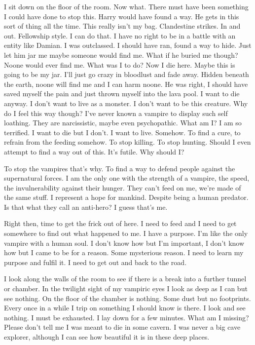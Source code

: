 I sit down on the floor of the room. Now what. There must have been something I could have done to stop this. Harry would have found a way. He gets in this sort of thing all the time. This really isn't my bag. Clandestine strikes. In and out. Fellowship style. I can do that. I have no right to be in a battle with an entity like Damian. I was outclassed. I should have ran, found a way to hide. Just let him jar me maybe someone would find me. What if he buried me though? Noone would ever find me. What was I to do? Now I die here. Maybe this is going to be my jar. I'll just go crazy in bloodlust and fade away. Hidden beneath the earth, noone will find me and I can harm noone. He was right, I should have saved myself the pain and just thrown myself into the lava pool. I want to die anyway. I don't want to live as a monster. I don't want to be this creature. Why do I feel this way though? I've never known a vampire to display such self loathing. They are narcissistic, maybe even psychopathic. What am I? I am so terrified. I want to die but I don't. I want to live. Somehow. To find a cure, to refrain from the feeding somehow. To stop killing. To stop hunting. Should I even attempt to find a way out of this. It's futile. Why should I?

To stop the vampires that's why. To find a way to defend people against the supernatural forces. I am the only one with the strength of a vampire, the speed, the invulnerability against their hunger. They can't feed on me, we're made of the same stuff. I represent a hope for mankind. Despite being a human predator. Is that what they call an anti-hero? I guess that's me.

Right then, time to get the frick out of here. I need to feed and I need to get somewhere to find out what happened to me. I have a purpose. I'm like the only vampire with a human soul. I don't know how but I'm important, I don't know how but I came to be for a reason. Some mysterious reason. I need to learn my purpose and fulfil it. I need to get out and back to the road.

I look along the walls of the room to see if there is a break into a further tunnel or chamber. In the twilight sight of my vampiric eyes I look as deep as I can but see nothing. On the floor of the chamber is nothing. Some dust but no footprints. Every once in a while I trip on something I should know is there. I look and see nothing. I must be exhausted. I lay down for a few minutes. What am I missing? Please don't tell me I was meant to die in some cavern. I was never a big cave explorer, although I can see how beautiful it is in these deep places.

